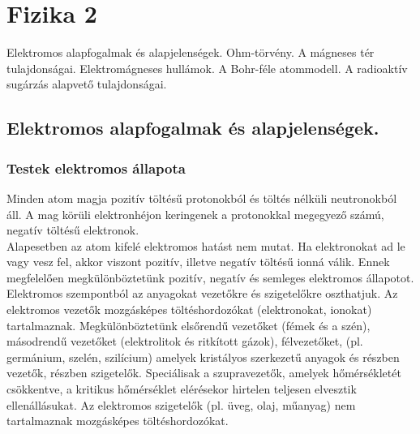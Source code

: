 \section{Fizika 2}
{\footnotesize Elektromos alapfogalmak és alapjelenségek. Ohm-törvény. A mágneses tér tulajdonságai. Elektromágneses hullámok. A Bohr-féle atommodell. A radioaktív sugárzás alapvető tulajdonságai.}
\subsection{Elektromos alapfogalmak és alapjelenségek.}
\subsubsection{Testek elektromos állapota}
Minden atom magja pozitív töltésű protonokból és töltés nélküli neutronokból áll. A mag körüli elektronhéjon keringenek a protonokkal megegyező számú, negatív töltésű elektronok.\\
Alapesetben az atom kifelé elektromos hatást nem mutat. Ha elektronokat ad le vagy vesz fel, akkor viszont pozitív, illetve negatív töltésű ionná válik. Ennek megfelelően megkülönböztetünk pozitív, negatív és semleges elektromos állapotot.\\
Elektromos szempontból az anyagokat vezetőkre és szigetelőkre oszthatjuk. Az elektromos vezetők mozgásképes töltéshordozókat (elektronokat, ionokat) tartalmaznak. Megkülönböztetünk elsőrendű vezetőket (fémek és a szén), másodrendű vezetőket (elektrolitok és ritkított gázok), félvezetőket, (pl. germánium, szelén, szilícium) amelyek kristályos szerkezetű anyagok és részben vezetők, részben szigetelők. Speciálisak a szupravezetők, amelyek hőmérsékletét csökkentve, a kritikus hőmérséklet elérésekor hirtelen teljesen elvesztik ellenállásukat. Az elektromos szigetelők (pl. üveg, olaj, műanyag) nem tartalmaznak mozgásképes töltéshordozókat.

